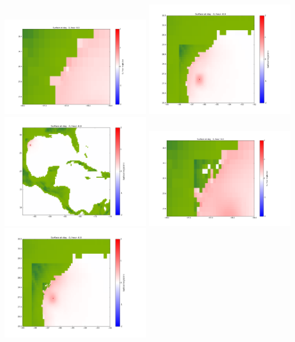 \documentclass[11pt]{article}
\begin{document}
\vskip 10pt 
\includegraphics[width=0.475\textwidth]{frame0020fig1001.png}
\includegraphics[width=0.475\textwidth]{frame0020fig1002.png}
\vskip 10pt 
\includegraphics[width=0.475\textwidth]{frame0020fig1003.png}
\vskip 10pt 
\includegraphics[width=0.475\textwidth]{frame0021fig1001.png}
\includegraphics[width=0.475\textwidth]{frame0021fig1002.png}
\end{document}
